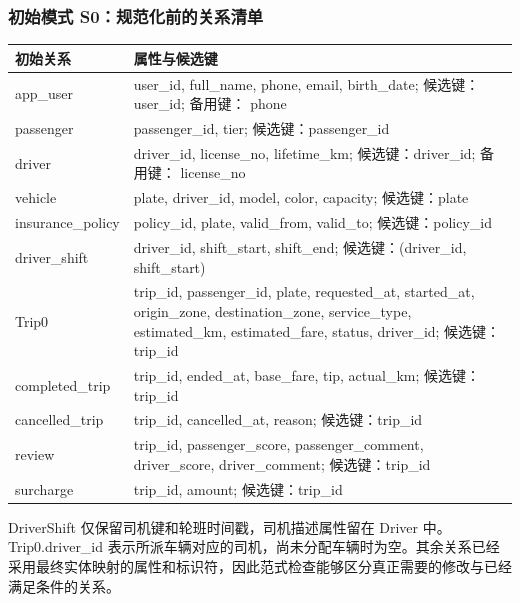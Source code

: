 \documentclass[11pt,a4paper]{article}
\renewcommand{\arraystretch}{1.3}
\begin{document}
\subsubsection*{初始模式 S0：规范化前的关系清单}
\begingroup\small\renewcommand{\arraystretch}{1.12}\begin{longtable}{p{3.1cm}p{12.1cm}}\toprule
初始关系 & 属性与候选键\\\midrule\endhead
app\_\allowbreak{}user & user\_\allowbreak{}id, full\_\allowbreak{}name, phone, email, birth\_\allowbreak{}date; 候选键：user\_\allowbreak{}id; 备用键： phone\\[4pt]
passenger & passenger\_\allowbreak{}id, tier; 候选键：passenger\_\allowbreak{}id\\[4pt]
driver & driver\_\allowbreak{}id, license\_\allowbreak{}no, lifetime\_\allowbreak{}km; 候选键：driver\_\allowbreak{}id; 备用键： license\_\allowbreak{}no\\[4pt]
vehicle & plate, driver\_\allowbreak{}id, model, color, capacity; 候选键：plate\\[4pt]
insurance\_\allowbreak{}policy & policy\_\allowbreak{}id, plate, valid\_\allowbreak{}from, valid\_\allowbreak{}to; 候选键：policy\_\allowbreak{}id\\[4pt]
driver\_\allowbreak{}shift & driver\_\allowbreak{}id, shift\_\allowbreak{}start, shift\_\allowbreak{}end; 候选键：(driver\_\allowbreak{}id, shift\_\allowbreak{}start)\\[4pt]
Trip0 & trip\_\allowbreak{}id, passenger\_\allowbreak{}id, plate, requested\_\allowbreak{}at, started\_\allowbreak{}at, origin\_\allowbreak{}zone, destination\_\allowbreak{}zone, service\_\allowbreak{}type, estimated\_\allowbreak{}km, estimated\_\allowbreak{}fare, status, driver\_\allowbreak{}id; 候选键：trip\_\allowbreak{}id\\[4pt]
completed\_\allowbreak{}trip & trip\_\allowbreak{}id, ended\_\allowbreak{}at, base\_\allowbreak{}fare, tip, actual\_\allowbreak{}km; 候选键：trip\_\allowbreak{}id\\[4pt]
cancelled\_\allowbreak{}trip & trip\_\allowbreak{}id, cancelled\_\allowbreak{}at, reason; 候选键：trip\_\allowbreak{}id\\[4pt]
review & trip\_\allowbreak{}id, passenger\_\allowbreak{}score, passenger\_\allowbreak{}comment, driver\_\allowbreak{}score, driver\_\allowbreak{}comment; 候选键：trip\_\allowbreak{}id\\[4pt]
surcharge & trip\_\allowbreak{}id, amount; 候选键：trip\_\allowbreak{}id\\[4pt]\bottomrule\end{longtable}\endgroup
DriverShift 仅保留司机键和轮班时间戳，司机描述属性留在 Driver 中。Trip0.driver\_\allowbreak{}id 表示所派车辆对应的司机，尚未分配车辆时为空。其余关系已经采用最终实体映射的属性和标识符，因此范式检查能够区分真正需要的修改与已经满足条件的关系。
\end{document}
